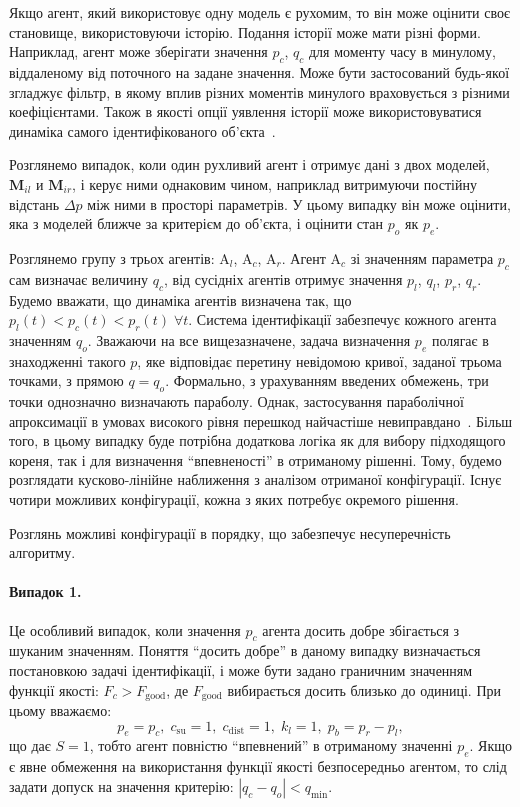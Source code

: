 Якщо агент, який використовує одну модель є рухомим, то він може
оцінити своє становище, використовуючи історію. Подання історії
може мати різні форми. Наприклад, агент може зберігати значення
$ p_c $,
$ q_c $ для моменту часу в минулому, віддаленому від поточного
на задане значення. Може бути застосований будь-якої згладжує
фільтр, в якому вплив різних моментів минулого враховується з
різними коефіцієнтами. Також в якості опції уявлення історії
може використовуватися динаміка самого ідентифікованого
об'єкта~\cite{mich_92}.

Розглянемо випадок, коли один рухливий агент і отримує дані з
двох моделей,
$ \mathbf{M}_{il}$ и
$ \mathbf{M}_{ir}$,
і керує ними однаковим чином, наприклад витримуючи постійну
відстань
$ \Delta p $ між ними в просторі параметрів. У цьому випадку він може
оцінити, яка з моделей ближче за критерієм до об'єкта, і оцінити стан
$ p_o $ як $ p_e $.

Розглянемо групу з трьох агентів:
$\mathrm{A}_l$,
$\mathrm{A}_c$,
$\mathrm{A}_r$.
Агент $\mathrm {A} _c$ зі значенням параметра $p_c$ сам визначає величину
$q_c$, від сусідніх агентів отримує значення $p_l$, $q_l$, $p_r$, $q_r$.
Будемо вважати, що динаміка агентів визначена так, що
$p_l(t) < p_c (t) < p_r(t) \; \forall t$.
Система ідентифікації забезпечує кожного агента
значенням $q_o$.
Зважаючи на все вищезазначене,
задача
визначення $p_e$ полягає в знаходженні такого $p$, яке відповідає перетину
невідомою кривої, заданої трьома точками, з прямою $q = q_o$.
Формально, з урахуванням введених обмежень, три точки однозначно визначають параболу. Однак,
застосування параболічної апроксимації в умовах високого рівня перешкод
найчастіше невиправдано~\cite{atu_asau27}.
Більш того, в цьому випадку буде потрібна додаткова
логіка як для вибору підходящого кореня, так і для визначення ``впевненості''
в отриманому рішенні.
Тому, будемо розглядати кусково-лінійне наближення з
аналізом отриманої конфігурації. Існує чотири можливих конфігурації,
кожна з яких потребує окремого рішення.

Розглянь можливі конфігурації в порядку, що забезпечує
несуперечність алгоритму.

\paragraph{Випадок 1.}
Це особливий випадок, коли значення
$ p_c $ агента досить добре збігається з шуканим значенням. Поняття
``досить добре'' в даному випадку визначається постановкою
задачі ідентифікації, і може бути задано граничним значенням функції якості:
$ F_c> F_{\mathrm{good}} $, де
$ F_{\mathrm{good}} $ вибирається досить близько до одиниці. При цьому
вважаємо:
%
\[
p_e = p_c, \; c_\mathrm{su} = 1, \;  c_\mathrm{dist} = 1, \;  k_l = 1, \;  p_b = p_r - p_l,
\]
%
що дає
$ S = 1 $, тобто агент повністю ``впевнений'' в отриманому значенні
$ p_e $. Якщо є явне обмеження на використання функції якості
безпосередньо агентом, то слід задати допуск на значення
критерію:
$ |q_c-q_o| < q_{\min}$.

